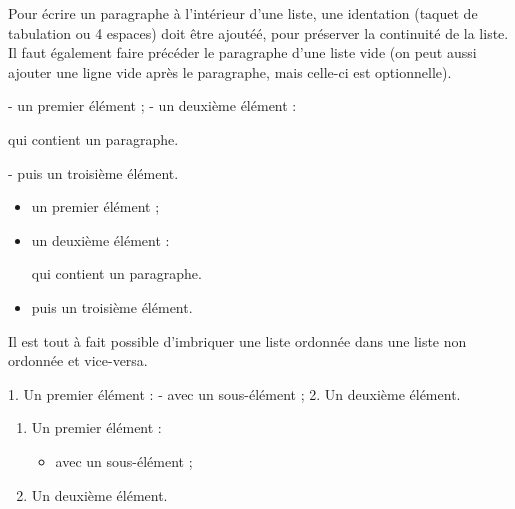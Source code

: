 \documentclass[
  11pt,
]{book}
\newenvironment{Shaded}{\begin{snugshade}}{\end{snugshade}}
\newcommand{\NormalTok}[1]{#1}
\newcommand{\SpecialStringTok}[1]{\textcolor[rgb]{0.31,0.60,0.02}{#1}}
\providecommand{\tightlist}{%
  \setlength{\itemsep}{0pt}\setlength{\parskip}{0pt}}
\numberwithin{equation}{section}
\numberwithin{countremarque}{section}
\begin{document}
Pour écrire un paragraphe à l'intérieur d'une liste, une identation (taquet de tabulation ou 4 espaces) doit être ajoutéé, pour préserver la continuité de la liste. Il faut également faire précéder le paragraphe d'une liste vide (on peut aussi ajouter une ligne vide après le paragraphe, mais celle-ci est optionnelle).

\begin{Shaded}
\begin{Highlighting}[]
\SpecialStringTok{{-} }\NormalTok{un premier élément ;}
\SpecialStringTok{{-} }\NormalTok{un deuxième élément :}

\NormalTok{    qui contient un paragraphe.}
    
\SpecialStringTok{{-} }\NormalTok{puis un troisième élément.}
\end{Highlighting}
\end{Shaded}

\begin{itemize}
\item
  un premier élément ;
\item
  un deuxième élément :

  qui contient un paragraphe.
\item
  puis un troisième élément.
\end{itemize}

Il est tout à fait possible d'imbriquer une liste ordonnée dans une liste non ordonnée et vice-versa.

\begin{Shaded}
\begin{Highlighting}[]
\SpecialStringTok{1. }\NormalTok{Un premier élément :}
\SpecialStringTok{    {-} }\NormalTok{avec un sous{-}élément ;}
\SpecialStringTok{2. }\NormalTok{Un deuxième élément.}
\end{Highlighting}
\end{Shaded}

\begin{enumerate}
\def\labelenumi{\arabic{enumi}.}
\tightlist
\item
  Un premier élément :

  \begin{itemize}
  \tightlist
  \item
    avec un sous-élément ;
  \end{itemize}
\item
  Un deuxième élément.
\end{enumerate}
\end{document}
